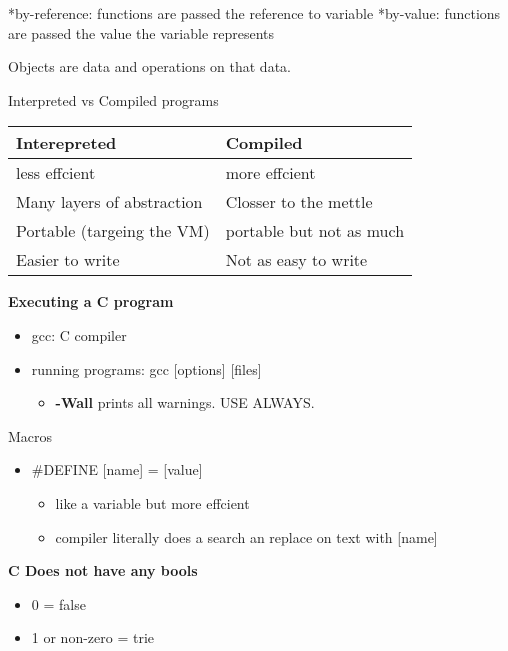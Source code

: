 \documentclass[11pt]{article}
\begin{document}
*by-reference: functions are passed the reference to variable
*by-value: functions are passed the value the variable represents

Objects are data and operations on that data.

Interpreted vs Compiled programs 

\begin{center}
\begin{tabular}{ll}
Interepreted & Compiled\\
\hline
less effcient & more effcient\\
Many layers of abstraction & Closser to the mettle\\
Portable (targeing the VM) & portable but not as much\\
Easier to write & Not as easy to write\\
\end{tabular}
\end{center}

\textbf{Executing a C program}
\begin{itemize}
\item gcc: C compiler
\item running programs: gcc [options] [files]
\begin{itemize}
\item \textbf{-Wall} prints all warnings. USE ALWAYS.
\end{itemize}
\end{itemize}

Macros
\begin{itemize}
\item \#DEFINE [name] = [value]
\begin{itemize}
\item like a variable but more effcient
\item compiler literally does a search an replace on text with [name]
\end{itemize}
\end{itemize}

\textbf{C Does not have any bools}
\begin{itemize}
\item 0 = false
\item 1 or non-zero  = trie
\end{itemize}
\end{document}
